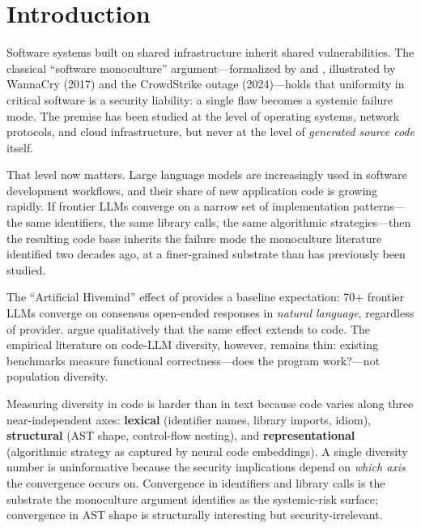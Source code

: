 \documentclass{article}
\begin{document}
\section{Introduction}
\label{sec:intro}

Software systems built on shared infrastructure inherit shared
vulnerabilities. The classical ``software monoculture'' argument---formalized
by \citet{geer2003} and \citet{birman2009}, illustrated by WannaCry (2017)
and the CrowdStrike outage (2024)---holds that uniformity in critical
software is a security liability: a single flaw becomes a systemic failure
mode. The premise has been studied at the level of operating systems, network
protocols, and cloud infrastructure, but never at the level of
\emph{generated source code} itself.

That level now matters. Large language models are increasingly used in
software development workflows, and their share of new application code is
growing rapidly. If frontier LLMs converge on a narrow set of implementation
patterns---the same identifiers, the same library calls, the same
algorithmic strategies---then the resulting code base inherits the failure
mode the monoculture literature identified two decades ago, at a
finer-grained substrate than has previously been studied.

The ``Artificial Hivemind'' effect of \citet{jiang2025hivemind} provides a
baseline expectation: 70+ frontier LLMs converge on consensus open-ended
responses in \emph{natural language}, regardless of provider.
\citet{wu2024monoculture} argue qualitatively that the same effect extends
to code. The empirical literature on code-LLM diversity, however, remains
thin: existing benchmarks measure functional correctness---does the program
work?---not population diversity.

Measuring diversity in code is harder than in text because code varies
along three near-independent axes: \textbf{lexical} (identifier names,
library imports, idiom), \textbf{structural} (AST shape, control-flow
nesting), and \textbf{representational} (algorithmic strategy as captured by
neural code embeddings). A single diversity
number is uninformative because the security implications depend on
\emph{which axis} the convergence occurs on. Convergence in identifiers and
library calls is the substrate the monoculture argument identifies as the
systemic-risk surface; convergence in AST shape is structurally interesting
but security-irrelevant.
\end{document}
